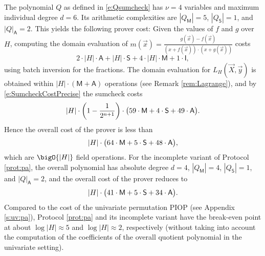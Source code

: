 \documentclass[11pt]{article}
\theoremstyle{definition}
\theoremstyle{remark}
\begin{document}
The polynomial $Q$ as defined in \eqref{e:Qsumcheck}  has $\nu = 4$ variables and maximum individual degree $d = 6$. 
Its arithmetic complexities are $|Q_\mathsf M| = 5$, $|Q_\mathsf S|= 1$, and $|Q|_\mathsf A = 2$.
This yields the following prover cost:
Given the values of $f$ and $g$ over $H$, computing the domain evaluation of $m(\vec x) = \frac{g(\vec x) - f(\vec x)}{(x + f(\vec x))\cdot (x + g(\vec x))}$ costs
\[
2\cdot |H| \cdot \mathsf A + |H|\cdot \mathsf S + 4\cdot |H|\cdot \mathsf M + 1 \cdot \mathsf I ,
\]
using batch inversion for the fractions.
The domain evaluation for $L_H(\vec X, \vec y)$ is obtained within $|H|\cdot (\mathsf M + \mathsf A)$ operations (see Remark \ref{rem:Lagrange}), and by \eqref{e:SumcheckCostPrecise} the sumcheck costs  
\begin{equation*}
|H| \cdot \left(1-\frac{1}{2^{n+1}}\right)\cdot \big(59 \cdot\textsf M +  4\cdot\textsf S + 49 \cdot \textsf A\big).
\end{equation*}
Hence the overall cost of the prover is less than
\begin{equation}
\label{e:PA:cost}
|H| \cdot \big(64 \cdot\textsf M +  5\cdot\textsf S + 48 \cdot \textsf A\big),
\end{equation}
which are $\bigO{|H|}$ field operations.
For the incomplete variant of Protocol \ref{prot:pa}, the overall polynomial has absolute degree $d=4$, $|Q_\mathsf M| = 4$, $|Q_\mathsf S|= 1$, and $|Q|_\mathsf A = 2$, and the overall cost of the prover reduces to 
\begin{equation}
\label{e:PA:incomplete:cost}
|H| \cdot \big(41 \cdot\textsf M +  5\cdot\textsf S + 34 \cdot \textsf A\big).
\end{equation}
%
Compared to the cost of the univariate permutation PIOP (see Appendix \ref{s:uv:pa}), Protocol \ref{prot:pa} and its incomplete variant have the break-even point at about $\log |H| \approx 5$ and $\log|H| \approx 2$, respectively (without taking 
into account the computation of the coefficients of the overall quotient polynomial  in the univariate setting).
\end{document}
